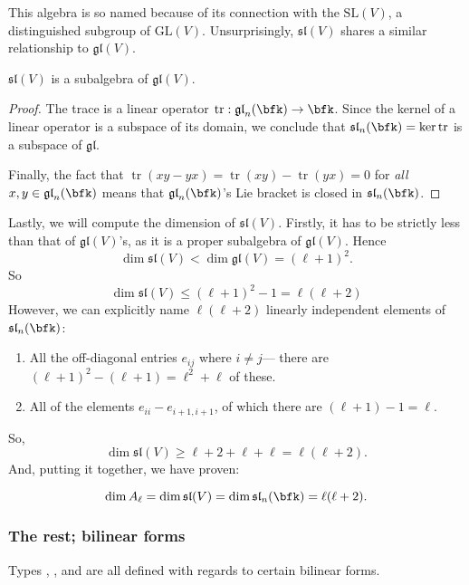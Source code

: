 \documentclass{article}
\DeclareMathOperator{\tr}{tr}
\newcommand*\GL{\ensuremath{\text{GL}}}
\newcommand*\SL{\ensuremath{\text{SL}}}
\newcommand*\glalg{\ensuremath{\mathfrak{gl}}}
\newcommand*\slalg{\ensuremath{\mathfrak{sl}}}
\begin{document}
This algebra is so named because of its connection with the  $\SL(V)$, a distinguished subgroup of $\GL(V)$.
Unsurprisingly, $\slalg(V)$ shares a similar relationship to $\glalg(V)$.

\begin{proposition}
    $\slalg(V)$ is a subalgebra of $\glalg(V)$.
\end{proposition}
\begin{proof}
    The trace is a linear operator $\tr: \glalg_n(\bfk) \to \bfk$.
    Since the kernel of a linear operator is a subspace of its domain, we conclude that $\slalg_n(\bfk) = \ker \tr$ is a subspace of $\glalg$.

    Finally, the fact that $\tr(xy - yx) = \tr(xy) - \tr(yx) = 0$ for \textit{all} $x,y \in \glalg_n(\bfk)$ means that $\glalg_n(\bfk)$'s Lie bracket is closed in $\slalg_n(\bfk)$.
\end{proof}

Lastly, we will compute the dimension of $\slalg(V)$.
Firstly, it has to be strictly less than that of $\glalg(V)$'s, as it is a proper subalgebra of $\glalg(V)$.
Hence
\[
    \dim \slalg(V) < \dim \glalg(V) = (\ell+1)^2.
\]
So
\[
    \dim \slalg(V) \leq (\ell+1)^2 - 1 = \ell(\ell+2)
\]
However, we can explicitly name $\ell(\ell+2)$ linearly independent elements of $\slalg_n(\bfk)$:
\begin{enumerate}
    \item 
        All the off-diagonal entries $e_{ij}$ where $i \neq j$--- there are $(\ell+1)^2 - (\ell + 1) = \ell^2 + \ell$ of these.
    \item 
        All of the elements $e_{ii} - e_{i+1,i+1}$, of which there are $(\ell + 1) -1 = \ell$. 
\end{enumerate}
So,
\[
    \dim \slalg(V) \geq \ell+2 + \ell + \ell = \ell(\ell + 2).
\]
And, putting it together, we have proven:
\begin{proposition}
    \[
        \dim A_\ell
        =
        \dim \slalg(V)
        =
        \dim \slalg_n(\bfk)
        =
        \ell(\ell+2).
    \]
\end{proposition}

\subsubsection{The rest; bilinear forms}

Types \sfB, \sfC, and \sfD are all defined with regards to certain bilinear forms.
\end{document}
